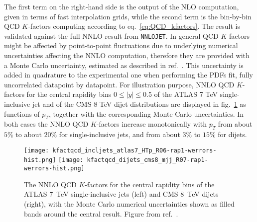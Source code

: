 The first term on the right-hand side is the output of the NLO computation, given in terms of fast interpolation grids,
while the second term is the bin-by-bin QCD $K$-factors computing according to eq.~\eqref{eq:QCD_kfactors}. 
The result is validated against the full NNLO result from {\tt NNLOJET}. In general QCD $K$-factors might be affected by 
point-to-point fluctuations due to underlying numerical uncertainties affecting the NNLO computation,
therefore they are provided with a Monte Carlo uncertainty, estimated as described in ref.~\cite{Ridder:2016rzm}.
This uncertainty is added in quadrature to the experimental one when performing the PDFs fit, fully uncorrelated datapoint 
by datapoint.
For illustration purpose, NNLO QCD $K$-factors for the central rapidity bins $0\leq |y| \leq 0.5$
of the ATLAS 7 TeV single-inclusive jet and of the CMS 8 TeV dijet distributions are displayed 
in fig.~\ref{fig:kfactqcd_werrors} as functions of $p_T$, together with the corresponding Monte Carlo uncertainties.
In both cases the NNLO QCD $K$-factors increase monotonically with $p_T$ from about $5\%$ to about $20\%$ for single-inclusive
jets, and from about $3\%$ to $15\%$ for dijets. 
\begin{figure}[!t]
    \centering
    \texttt{[image: kfactqcd\_incljets\_atlas7\_HTp\_R06-rap1-werrors-hist.png]}
    \texttt{[image: kfactqcd\_dijets\_cms8\_mjj\_R07-rap1-werrors-hist.png]}
    \caption{The NNLO QCD $K$-factors for the central rapidity bins of the ATLAS 
       7~TeV single-inclusive jets (left) and CMS 8~TeV dijets (right), with
       the Monte Carlo numerical uncertainties shown as filled bands around the 
       central result. Figure from ref.~\cite{AbdulKhalek:2020jut}.}
\label{fig:kfactqcd_werrors} 
\end{figure}

